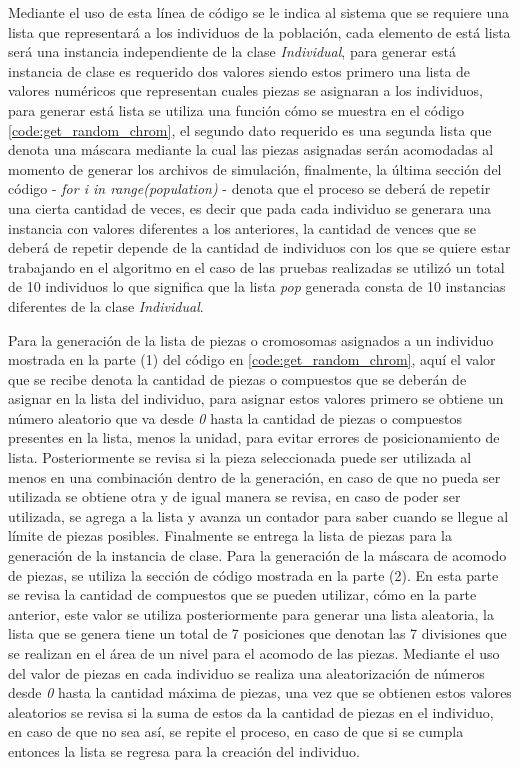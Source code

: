 Mediante el uso de esta línea de código se le indica al sistema que se requiere
una lista que representará a los individuos de la población, cada elemento de
está lista será una instancia independiente de la clase \textit{Individual},
para generar está instancia de clase es requerido dos valores siendo estos
primero una lista de valores numéricos que representan cuales piezas se
asignaran a los individuos, para generar está lista se utiliza una función cómo
se muestra en el código \ref{code:get_random_chrom}, el segundo dato requerido
es una segunda lista que denota una máscara mediante la cual las piezas
asignadas serán acomodadas al momento de generar los archivos de simulación,
finalmente, la última sección del código - \textit{for i in range(population)} -
denota que el proceso se deberá de repetir una cierta cantidad de veces, es
decir que pada cada individuo se generara una instancia con valores diferentes a
los anteriores, la cantidad de vences que se deberá de repetir depende de la
cantidad de individuos con los que se quiere estar trabajando en el algoritmo en
el caso de las pruebas realizadas se utilizó un total de 10 individuos lo que
significa que la lista \textit{pop} generada consta de 10 instancias diferentes
de la clase \textit{Individual}. 

Para la generación de la lista de piezas o cromosomas asignados a un individuo
mostrada en la parte (1) del código en \ref{code:get_random_chrom}, aquí el
valor que se recibe denota la cantidad de piezas o compuestos que se deberán de
asignar en la lista del individuo, para asignar estos valores primero se
obtiene un número aleatorio que va desde \textit{0} hasta la cantidad de piezas o
compuestos presentes en la lista, menos la unidad, para evitar errores de
posicionamiento de lista. Posteriormente se revisa si la pieza seleccionada
puede ser utilizada al menos en una combinación dentro de la generación, en caso
de que no pueda ser utilizada se obtiene otra y de igual manera se revisa, en
caso de poder ser utilizada, se agrega a la lista y avanza un contador para saber
cuando se llegue al límite de piezas posibles. Finalmente se entrega la
lista de piezas para la generación de la instancia de clase. Para la generación
de la máscara de acomodo de piezas, se utiliza la sección de código mostrada en
la parte (2). En esta parte se revisa la cantidad de
compuestos que se pueden utilizar, cómo en la parte anterior, este valor se
utiliza posteriormente para generar una lista aleatoria, la lista que se genera
tiene un total de 7 posiciones que denotan las 7 divisiones que se realizan en el
área de un nivel para el acomodo de las piezas. Mediante el uso del valor de
piezas en cada individuo se realiza una aleatorización de números desde
\textit{0} hasta la cantidad máxima de piezas, una vez que se obtienen estos valores
aleatorios se revisa si la suma de estos da la cantidad de piezas en el
individuo, en caso de que no sea así, se repite el proceso, en caso de que si se
cumpla entonces la lista se regresa para la creación del individuo.

